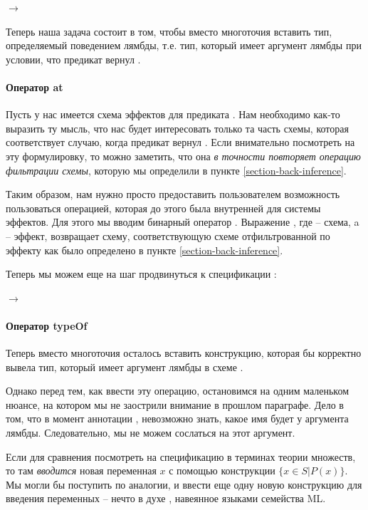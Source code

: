 {
   $\rightarrow$  \\
}{}

Теперь наша задача состоит в том, чтобы вместо многоточия вставить тип, определяемый поведением лямбды, т.е. тип, который имеет аргумент лямбды при условии, что предикат вернул .


\paragraph{Оператор at}

Пусть у нас имеется схема эффектов для предиката . Нам необходимо как-то выразить ту мысль, что нас будет интересовать только та часть схемы, которая соответствует случаю, когда предикат вернул . Если внимательно посмотреть на эту формулировку, то можно заметить, что она  \emph{в точности повторяет операцию фильтрации схемы}, которую мы определили в пункте \ref{section-back-inference}.

Таким образом, нам нужно просто предоставить пользователем возможность пользоваться операцией, которая до этого была внутренней для системы эффектов. Для этого мы вводим бинарный оператор . Выражение , где  -- схема, a  -- эффект, возвращает схему, соответствующую схеме  отфильтрованной по эффекту  как было определено в пункте \ref{section-back-inference}.

Теперь мы можем еще на шаг продвинуться к спецификации :

{
   $\rightarrow$ 
}{}


\paragraph{Оператор typeOf}

Теперь вместо многоточия осталось вставить конструкцию, которая бы корректно вывела тип, который имеет аргумент лямбды в схеме .

Однако перед тем, как ввести эту операцию, остановимся на одним маленьком нюансе, на котором мы не заострили внимание в прошлом параграфе. Дело в том, что в момент аннотации , невозможно знать, какое имя будет у аргумента лямбды. Следовательно, мы не можем сослаться на этот аргумент.

Если для сравнения посмотреть на спецификацию  в терминах теории множеств, то там \emph{вводится} новая переменная $x$ с помощью конструкции $\{ x \in S | P(x) \}$. Мы могли бы поступить по аналогии, и ввести еще одну новую конструкцию для введения переменных -- нечто в духе , навеянное языками семейства ML.

